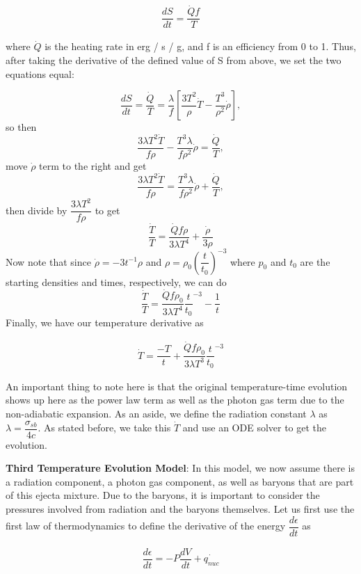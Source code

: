 \documentclass[11pt,a4paper]{article}
\begin{document}
\begin{align}
	\dfrac{dS}{dt} = \dfrac{\dot{Q} f}{T}
\end{align}

where $\dot{Q}$ is the heating rate in erg / s / g, and f is an efficiency from 0 to 1. Thus, after taking the derivative of the defined value of S from above, we set the two equations equal: 

$$ \dfrac{dS}{dt} = \dfrac{\dot{Q}}{T} = \dfrac{\lambda}{f} [\dfrac{3T^2}{\rho}\dot{T} - \dfrac{T^3}{\rho^2}\dot{\rho}],$$ so then
$$ \dfrac{3 \lambda T^2 \dot{T}}{f \rho} - \dfrac{T^3 \lambda}{f \rho^2}\dot{\rho} = \dfrac{\dot{Q}}{T}, $$ move $\dot{\rho}$ term to the right and get 
$$ \dfrac{3 \lambda T^2 \dot{T}}{f \rho} = \dfrac{T^3 \lambda}{f \rho^2}\dot{\rho} + \dfrac{\dot{Q}}{T}, $$ then divide by $\dfrac{3 \lambda T^2}{f \rho} $ to get
$$ \dfrac{\dot{T}}{T} = \dfrac{\dot{Q} f \rho}{3 \lambda T^4} + \dfrac{\dot{\rho}}{3 \rho} $$ Now note that since $ \dot{\rho} = -3t^{-1} \rho $ and $ \rho = \rho_0 (\dfrac{t}{t_0})^{-3} $ where $p_0$ and $t_0$ are the starting densities and times, respectively, we can do 
$$ \dfrac{\dot{T}}{T} = \dfrac{\dot{Q} f \rho_0}{3 \lambda T^4} \dfrac{t}{t_0}^{-3} - \dfrac{1}{t} $$ Finally, we have our temperature derivative as 

\begin{align}
	\dot{T} = \dfrac{-T}{t} + \dfrac{\dot{Q} f \rho_0}{3 \lambda T^3} 	\dfrac{t}{t_0}^{-3} 
\end{align}

 An important thing to note here is that the original temperature-time evolution shows up here as the power law term as well as the photon gas term due to the non-adiabatic expansion. As an aside, we define the radiation constant $\lambda$ as $\lambda =  \dfrac{\sigma_{sb}}{4 c}$. As stated before, we take this $\dot{T}$ and use an ODE solver to get the evolution.

\textbf{Third Temperature Evolution Model}: In this model, we now assume there is a radiation component, a photon gas component, as well as baryons that are part of this ejecta mixture. Due to the baryons, it is important to consider the pressures involved from radiation and the baryons themselves. Let us first use the first law of thermodynamics to define the derivative of the energy $\dfrac{d \epsilon}{dt}$ as

\begin{align}
	\dfrac{d \epsilon}{dt} = -P \dfrac{dV}{dt} + \dot{q_{nuc}}
\end{align}
\end{document}
